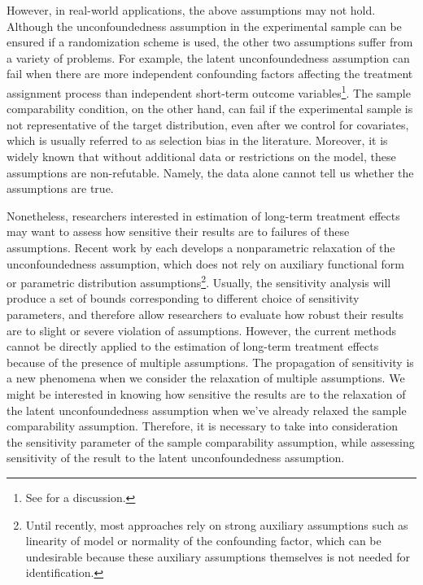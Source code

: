 \documentclass[12pt]{article}
\begin{document}
	However, in real-world applications, the above assumptions may not hold. Although the unconfoundedness assumption in the experimental sample can be ensured if a randomization scheme is used, the other two assumptions suffer from a variety of problems. For example, the latent unconfoundedness assumption can fail when there are more independent confounding factors affecting the treatment assignment process than independent short-term outcome variables\footnote{See \textcite{athey2020combining} for a discussion.}. The sample comparability condition, on the other hand, can fail if the experimental sample is not representative of the target distribution, even after we control for covariates, which is usually referred to as selection bias in the literature. Moreover, it is widely known that without additional data or restrictions on the model, these assumptions are non-refutable. Namely, the data alone cannot tell us whether the assumptions are true. 
	
	Nonetheless, researchers interested in estimation of long-term treatment effects may want to assess how sensitive their results are to failures of these assumptions. Recent work by \textcite{masten2018identification, yadlowsky2018bounds, kallus2018confounding} each develops a nonparametric relaxation of the unconfoundedness assumption, which does not rely on auxiliary functional form or parametric distribution assumptions\footnote{Until recently, most approaches rely on strong auxiliary assumptions such as linearity of model or normality of the confounding factor, which can be undesirable because these auxiliary assumptions themselves is not needed for identification. }. Usually, the sensitivity analysis will produce a set of bounds corresponding to different choice of sensitivity parameters, and therefore allow researchers to evaluate how robust their results are to slight or severe violation of assumptions. However, the current methods cannot be directly applied to the estimation of long-term treatment effects because of the presence of multiple assumptions. The propagation of sensitivity is a new phenomena when we consider the relaxation of multiple assumptions. We might be interested in knowing how sensitive the results are to the relaxation of the latent unconfoundedness assumption when we've already relaxed the sample comparability assumption. Therefore, it is necessary to take into consideration the sensitivity parameter of the sample comparability assumption, while assessing sensitivity of the result to the latent unconfoundedness assumption. 
    
\end{document}
